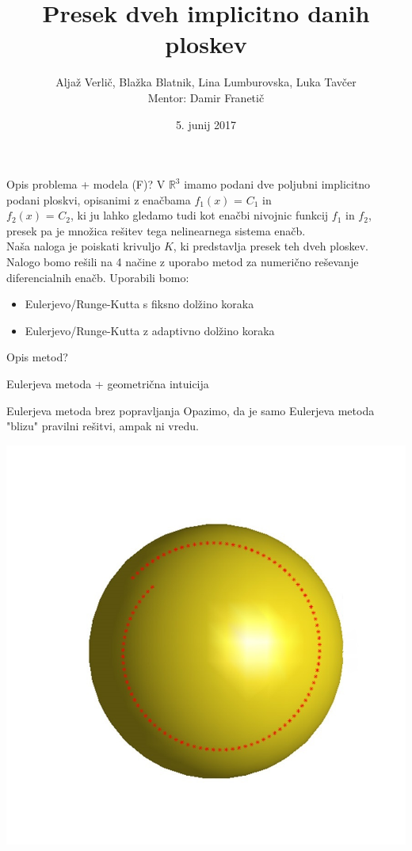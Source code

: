 \documentclass{beamer}
\title{Presek dveh implicitno danih ploskev}
\author[Avtorji]{Aljaž Verlič, Blažka Blatnik, Lina Lumburovska, Luka Tavčer\\
Mentor: Damir Franetič}
\date{5. junij 2017}
\begin{document}
\begin{frame}
  \titlepage
\end{frame}

\begin{frame}{Opis problema + modela (F)?}
   V $\mathbb{R}^3$ imamo podani dve poljubni implicitno podani ploskvi, opisanimi z enačbama $f_{1}(x)$ = $C_{1}$ in\\ $f_{2}(x)$ = $C_{2}$, ki ju lahko gledamo tudi kot enačbi nivojnic funkcij $f_{1}$ in $f_{2}$, presek pa je množica rešitev tega nelinearnega sistema enačb.\\
   Naša naloga je poiskati krivuljo $K$, ki predstavlja presek teh dveh ploskev.\\
   Nalogo bomo rešili na 4 načine z uporabo metod za numerično reševanje diferencialnih enačb. Uporabili bomo:
   \begin{itemize}  
   	\item Eulerjevo/Runge-Kutta s fiksno dolžino koraka
   	\item Eulerjevo/Runge-Kutta z adaptivno dolžino koraka
   \end{itemize}
\end{frame}

\begin{frame}{Opis metod?}

\end{frame}

\begin{frame}{Eulerjeva metoda + geometrična intuicija}
	

\end{frame}

\begin{frame}{Eulerjeva metoda brez popravljanja}
	Opazimo, da je samo Eulerjeva metoda "blizu" pravilni rešitvi, ampak ni vredu. \\
	\begin{center}
		\includegraphics[scale=0.30]{eul1}
	\end{center}
\end{frame}
\end{document}
